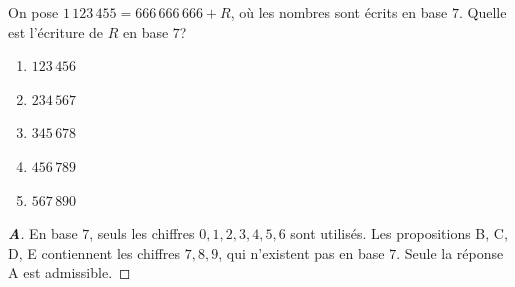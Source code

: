% 
%
On pose $1\,123\,455 = 666\,666\,666 + R$, où les nombres sont écrits en base
$7$. Quelle est l'écriture de $R$ en base $7$?
\begin{enumerate}
  \item $123\,456$
  \item $234\,567$
  \item $345\,678$
  \item $456\,789$
  \item $567\,890$
\end{enumerate}
%
%
\begin{proof}[\textbf{A}]
En base $7$, seuls les chiffres $0, 1, 2, 3, 4, 5, 6$ sont utilisés. Les
propositions B, C, D, E contiennent les chiffres $7, 8, 9$, qui n'existent pas
en base $7$. Seule la réponse A est admissible.
\end{proof}